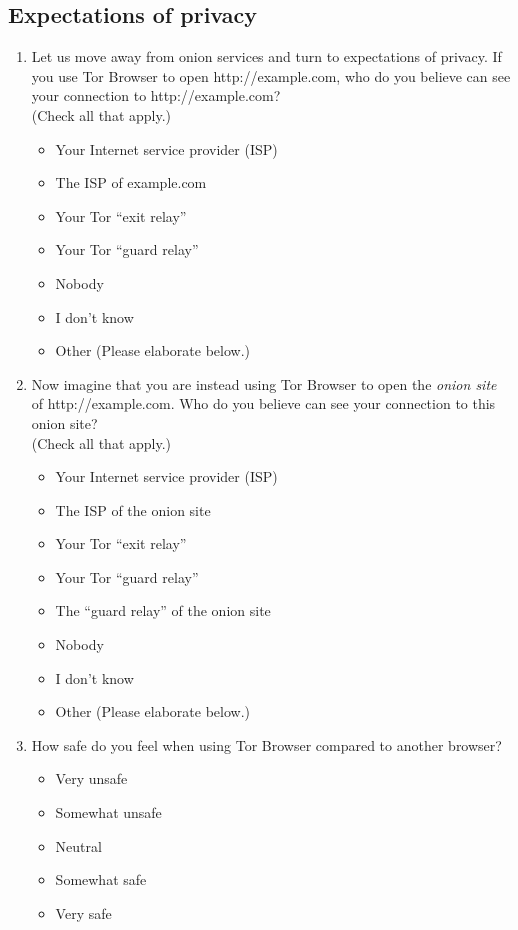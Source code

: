 \subsection{Expectations of privacy}
\begin{enumerate}
    \item Let us move away from onion services and turn to expectations of
        privacy. If you use Tor Browser to open http://example.com, who do you
        believe can see your connection to http://example.com?\\(Check all that
        apply.)
        \begin{itemize}[label=$\Square$]
            \item Your Internet service provider (ISP)
            \item The ISP of example.com
            \item Your Tor ``exit relay''
            \item Your Tor ``guard relay''
            \item Nobody
            \item I don't know
            \item Other (Please elaborate below.)
        \end{itemize}

    \item Now imagine that you are instead using Tor Browser to open the
        \emph{onion site} of http://example.com. Who do you believe can see
        your connection to this onion site?\\(Check all that apply.)
        \begin{itemize}[label=$\Square$]
            \item Your Internet service provider (ISP)
            \item The ISP of the onion site
            \item Your Tor ``exit relay''
            \item Your Tor ``guard relay''
            \item The ``guard relay'' of the onion site
            \item Nobody
            \item I don't know
            \item Other (Please elaborate below.)
        \end{itemize}

    \item How safe do you feel when using Tor Browser compared to another
        browser?
        \begin{itemize}[label=$\Circle$]
            \item Very unsafe
            \item Somewhat unsafe
            \item Neutral
            \item Somewhat safe
            \item Very safe
        \end{itemize}


\end{enumerate}
